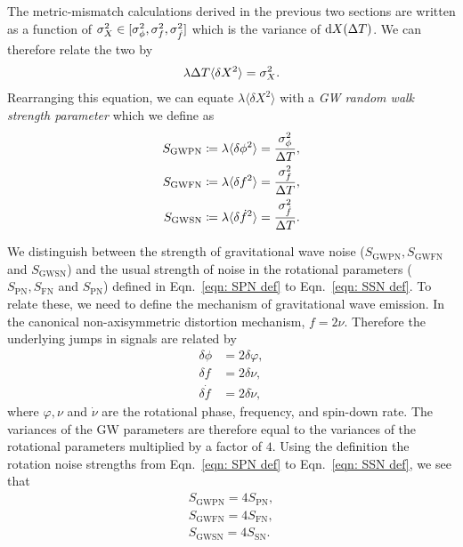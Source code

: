 \documentclass[../full_thesis/full_thesis.tex]{subfiles}
\begin{document}
The metric-mismatch calculations derived in the previous two sections are
written as a function of $\sigma_{X}^{2} \in [\sigma_{\phi}^{2}, \sigma_{f}^{2}, \sigma_{\dot{f}}^{2}]$
which is the variance of $\mathrm{d} X(\Delta T)$. We can therefore relate the two by
\begin{align}
\lambda \Delta T \langle \delta X^{2}\rangle = \sigma_{X}^{2}.
\end{align}
Rearranging this equation, we can equate $\lambda \langle \delta X^2\rangle$ with
a \emph{GW random walk strength parameter} which we define as
\begin{align}
S_{\mathrm{GWPN}} & \coloneqq \lambda \langle \delta \phi^{2} \rangle =
\frac{\sigma_{\phi}^{2}}{\Delta T}, \label{eqn: SPN 2}\\
S_{\mathrm{GWFN}} & \coloneqq \lambda \langle \delta f^{2} \rangle =
\frac{\sigma_{f}^{2}}{\Delta T}, \label{eqn: SFN 2}\\
S_{\mathrm{GWSN}} & \coloneqq \lambda \langle \delta \dot{f}^{2} \rangle =
\frac{\sigma_{\dot{f}}^{2}}{\Delta T}.  \label{eqn: SSN 2}
\end{align}

We distinguish between the strength of gravitational wave noise
($S_{\textrm{GWPN}}, S_{\textrm{GWFN}}$ and $S_{\textrm{GWSN}}$) and the usual
strength of noise in the rotational parameters ($S_{\textrm{PN}},
S_{\textrm{FN}}$ and $S_{\textrm{PN}}$) defined in Eqn.~\eqref{eqn: SPN def} to
Eqn.~\eqref{eqn: SSN def}. To relate these, we need to define the
mechanism of gravitational wave emission. In the canonical non-axisymmetric
distortion mechanism, $f = 2\nu$. Therefore the underlying jumps in signals are
related by
\begin{align}
\delta \phi & = 2\delta \varphi, \\
\delta f & = 2\delta\nu, \\
\delta \dot{f}& =2\delta\dot{\nu},
\end{align}
where $\varphi, \nu$ and $\dot{\nu}$ are the rotational phase,
frequency, and spin-down rate. The variances of the GW parameters are
therefore equal to the variances of the rotational parameters multiplied by a
factor of $4$. Using the definition the rotation noise strengths from
Eqn.~\eqref{eqn: SPN def} to Eqn.~\eqref{eqn: SSN def}, we see that
\begin{align}
S_{\textrm{GWPN}} = 4S_{\textrm{PN}}, \\
S_{\textrm{GWFN}} = 4S_{\textrm{FN}}, \label{eqn: relation}\\
S_{\textrm{GWSN}} = 4S_{\textrm{SN}}.
\end{align}
\end{document}
